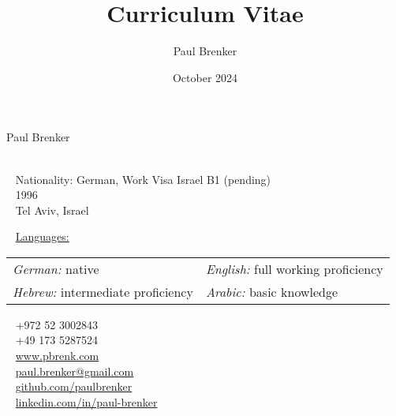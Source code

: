 \documentclass{style/modernsimplecv}
\title{Curriculum Vitae}
\author{Paul Brenker}
\date{October 2024}
\begin{document}
\thispagestyle{empty}

\begin{minipage}[t]{0.21\textwidth}
    \vspace{0pt}
\end{minipage}
\hfill
\begin{minipage}[t]{1\textwidth}
    \vspace{0pt}
    \begin{shaded*}
        \begin{minipage}[t]{0.47\textwidth}
            \vspace{0pt}
            {\par\centering\huge{Paul Brenker}} \\[0.3cm]
            \faGlobe~ Nationality: German, Work Visa Israel B1 (pending)\\
            \faBirthdayCake~ 1996 \\
            \faMapMarker~ Tel Aviv, Israel \\
            \begin{spacing}{0.5}
                {
                    \faCommentsO~ \underline{Languages:} \\
                    \begin{tabular}{l l}
                        \emph{German:} native & \emph{English:} full working proficiency \\
                        \emph{Hebrew:} intermediate proficiency & \emph{Arabic:} basic knowledge \\ 
                    \end{tabular}
                }
            \end{spacing}
            \vspace{4pt}
        \end{minipage}\hfill
        \begin{minipage}[t]{0.36\textwidth}
            \vspace{29pt} 
            \faPhone~ +972 52 3002843 \\
            \faPhone~ +49 173 5287524 \\

            \faLink~ \protect\url{www.pbrenk.com}\\
            \faAt~ \protect\url{paul.brenker@gmail.com} \\
            \faGithub~ \protect\url{github.com/paulbrenker} \\
            \faLinkedin~ \protect\url{linkedin.com/in/paul-brenker}\\
        \end{minipage}
        \hfill
    \end{shaded*}
\end{minipage}\\[15pt]
\end{document}
